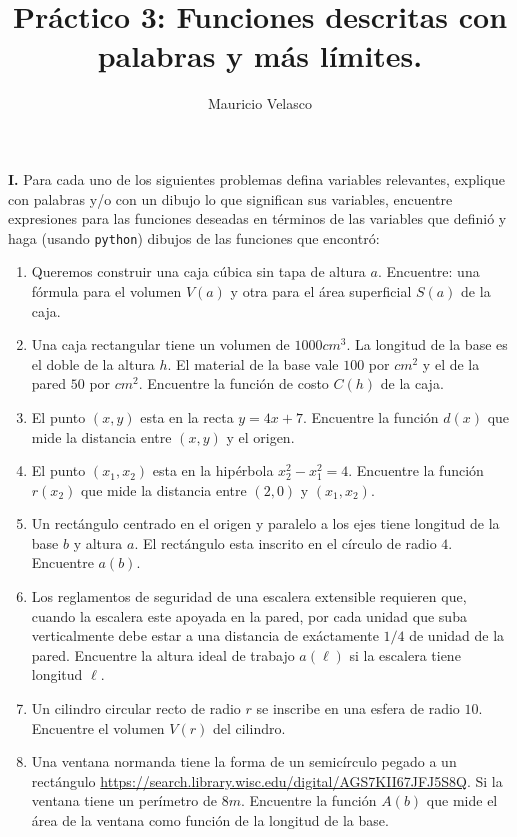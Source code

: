 \documentclass[12pt, a4paper]{article}
\date{}
\begin{document}
\title{Pr\'actico 3: Funciones descritas con palabras y más límites.}
\author{Mauricio Velasco}
\maketitle{}
{\bf I.} Para cada uno de los siguientes problemas defina variables relevantes, explique con palabras y/o con un dibujo lo que significan sus variables, encuentre expresiones para las funciones deseadas en términos de las variables que definió y haga (usando \verb!python!) dibujos de las funciones que encontró:\\
\begin{enumerate} 
\item Queremos construir una caja cúbica sin tapa de altura $a$. Encuentre: una fórmula para el volumen $V(a)$ y otra para el área superficial $S(a)$ de la caja.

\item Una caja rectangular tiene un volumen de $1000cm^3$. La longitud de la base es el doble de la altura $h$. El material de la base vale $100$ por $cm^2$ y el de la pared $50$ por $cm^2$. Encuentre la función de costo $C(h)$ de la caja.

\item El punto $(x,y)$ esta en la recta $y=4x+7$. Encuentre la función $d(x)$ que mide la distancia entre $(x,y)$ y el origen.

\item El punto $(x_1,x_2)$ esta en la hipérbola $x_2^2-x_1^2=4$. Encuentre la función $r(x_2)$ que mide la distancia entre $(2,0)$ y $(x_1,x_2)$.

\item Un rectángulo centrado en el origen y paralelo a los ejes tiene longitud de la base $b$ y altura $a$. El rectángulo esta inscrito en el círculo de radio $4$. Encuentre $a(b)$. 

\item Los reglamentos de seguridad de una escalera extensible requieren que, cuando la escalera este apoyada en la pared, por cada unidad que suba verticalmente debe estar a una distancia de exáctamente $1/4$ de unidad de la pared.  Encuentre la altura ideal de trabajo $a(\ell)$ si la escalera tiene longitud $\ell$.

\item Un cilindro circular recto de radio $r$ se inscribe en una esfera de radio $10$. Encuentre el volumen $V(r)$ del cilindro.

\item Una ventana normanda tiene la forma de un semicírculo pegado a un rectángulo \url{https://search.library.wisc.edu/digital/AGS7KII67JFJ5S8Q}. Si la ventana tiene un perímetro de $8m$. Encuentre la función $A(b)$ que mide el área de la ventana como función de la longitud de la base.


\end{enumerate}
\end{document}
